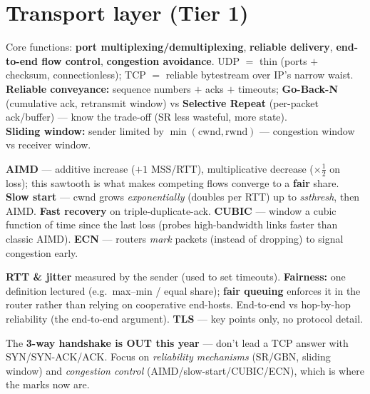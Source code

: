 \documentclass[11pt,a4paper]{article}
\begin{document}
\hrulefill

\section{Transport layer (Tier 1)}

\begin{must}
Core functions: \textbf{port multiplexing/demultiplexing}, \textbf{reliable delivery}, \textbf{end-to-end flow control}, \textbf{congestion avoidance}. UDP $=$ thin (ports $+$ checksum, connectionless); TCP $=$ reliable bytestream over IP's narrow waist.\\[2pt]
\textbf{Reliable conveyance:} sequence numbers $+$ acks $+$ timeouts; \textbf{Go-Back-N} (cumulative ack, retransmit window) vs \textbf{Selective Repeat} (per-packet ack/buffer) --- know the trade-off (SR less wasteful, more state).\\[2pt]
\textbf{Sliding window:} sender limited by $\min(\text{cwnd},\text{rwnd})$ --- congestion window vs receiver window.
\end{must}

\begin{must}[title=Congestion control]
\textbf{AIMD} --- additive increase ($+1$ MSS/RTT), multiplicative decrease ($\times\tfrac12$ on loss); this sawtooth is what makes competing flows converge to a \textbf{fair} share. \textbf{Slow start} --- cwnd grows \emph{exponentially} (doubles per RTT) up to \emph{ssthresh}, then AIMD. \textbf{Fast recovery} on triple-duplicate-ack. \textbf{CUBIC} --- window a cubic function of time since the last loss (probes high-bandwidth links faster than classic AIMD). \textbf{ECN} --- routers \emph{mark} packets (instead of dropping) to signal congestion early.
\end{must}

\begin{useful}
\textbf{RTT \& jitter} measured by the sender (used to set timeouts). \textbf{Fairness:} one definition lectured (e.g.\ max--min / equal share); \textbf{fair queuing} enforces it in the router rather than relying on cooperative end-hosts. End-to-end vs hop-by-hop reliability (the end-to-end argument). \textbf{TLS} --- key points only, no protocol detail.
\end{useful}

\begin{gotcha}
The \textbf{3-way handshake is OUT this year} --- don't lead a TCP answer with SYN/SYN-ACK/ACK. Focus on \emph{reliability mechanisms} (SR/GBN, sliding window) and \emph{congestion control} (AIMD/slow-start/CUBIC/ECN), which is where the marks now are.
\end{gotcha}
\end{document}
